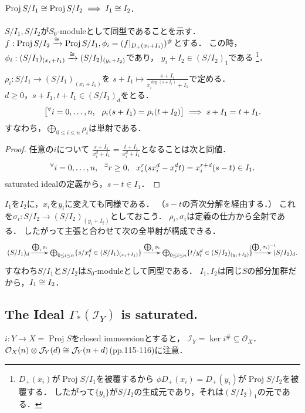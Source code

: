 \documentclass[a4paper]{jsarticle}
\newcommand{\shI}{\mathcal{I}}
\newcommand{\shJ}{\mathcal{J}}
\newcommand{\shO}{\mathcal{O}}
\newcommand{\Proj}{\operatorname{Proj}}
\begin{document}
    \paragraph{$\Proj S/I_1 \iso \Proj S/I_2 \implies I_1 \iso I_2$.}
    $S/I_1, S/I_2$が$S_0$-moduleとして同型であることを示す．
    $f: \Proj S/I_2 \isomap \Proj S/I_1, \phi_i=(f|_{D_+(x_i+I_1)})^{\#}$とする．
    この時，$\phi_i: (S/I_1)_{(x_i+I_1)} \xrightarrow{\cong} (S/I_2)_{(y_i+I_2)}$であり，
    $y_i+I_2 \in (S/I_2)_1$である
    \footnote
    {
        $D_+(x_i)$が$\Proj S/I_1$を被覆するから
        $\phi D_+(x_i)=D_+(y_i)$が$\Proj S/I_2$を被覆する．
        したがって$\{y_i\}$が$S/I_2$の生成元であり，それは$(S/I_2)_1$の元である．
    }．
    \begin{Claim}
        $\rho_i: S/I_1 \to (S/I_1)_{(x_i+I_1)}$を
        $s+I_1 \mapsto \frac{s+I_1}{x_i^{\deg (s+I_1)}+I_1}$で定める．
        $d \geq 0，s+I_1, t+I_1 \in (S/I_1)_d$をとる．
        \[
            \left[ {}^{\forall} i=0,\dots,n,~~ \rho_i(s+I_1)=\rho_i(t+I_2) \right]
                \implies s+I_1=t+I_1.
        \]
        すなわち，$\bigoplus_{0 \leq i \leq n} \rho_i$は単射である．
    \end{Claim}
    \begin{proof}
        任意の$i$について
        $\frac{s+I_1}{x_i^d+I_1}=\frac{t+I_1}{x_i^d+I_1}$となることは次と同値．
        \[ {}^{\forall} i=0,\dots,n,~~ {}^{\exists} r \geq 0,~~ x_i^r(s x_i^d-x_i^d t)=x_i^{r+d}(s-t) \in I_1. \]
        saturated idealの定義から，$s-t \in I_1$．
    \end{proof}
    $I_1$を$I_2$に，$x_i$を$y_i$に変えても同様である．
    （$s-t$の斉次分解を経由する．）
    これを$\sigma_i: S/I_2 \to (S/I_2)_{(y_i+I_2)}$としておこう．
    $\rho_i, \sigma_i$は定義の仕方から全射である．
    したがって主張と合わせて次の全単射が構成できる．
    \[
        \xymatrix
        {
            (S/I_1)_d \ar[r]^-{\bigoplus_i \rho_i}&
            \bigoplus_{0 \leq i \leq n} \{ s/x_i^d \in (S/I_1)_{(x_i+I_1)} \} \ar[r]^-{\bigoplus_i \phi_i}&
            \bigoplus_{0 \leq i \leq n} \{ t/y_i^d \in (S/I_2)_{(y_i+I_2)} \} \ar[r]^-{(\bigoplus_i \sigma_i)^{-1}}&
            (S/I_2)_d.
        }
    \]
    すなわち$S/I_1$と$S/I_2$は$S_0$-moduleとして同型である．
    $I_1, I_2$は同じ$S$の部分加群だから，$I_1 \cong I_2$．

    \subsection{The Ideal $\Gamma_*(\shI_Y)$ is saturated.}
    $i: Y \to X=\Proj S$をclosed immsersionとすると，
    $\shI_Y=\ker i^{\#} \subseteq \shO_X$．
    $\shO_X(n) \otimes \shJ_Y(d) \iso \shJ_Y(n+d)$(pp.115-116)に注意．
\end{document}
